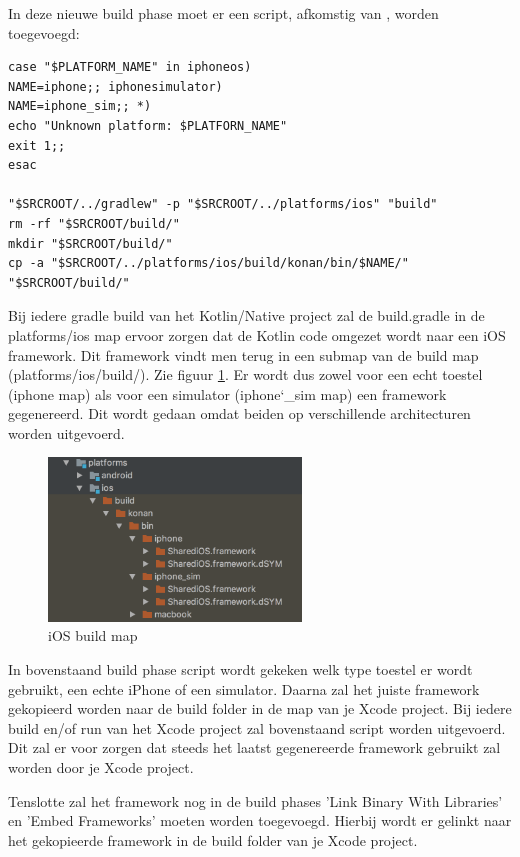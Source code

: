 In deze nieuwe build phase moet er een script, afkomstig van \textcite{AlbertGao}, worden toegevoegd: 
\begin{lstlisting}
case "$PLATFORM_NAME" in iphoneos)
NAME=iphone;; iphonesimulator)
NAME=iphone_sim;; *)
echo "Unknown platform: $PLATFORN_NAME"
exit 1;;
esac

"$SRCROOT/../gradlew" -p "$SRCROOT/../platforms/ios" "build"
rm -rf "$SRCROOT/build/"
mkdir "$SRCROOT/build/"
cp -a "$SRCROOT/../platforms/ios/build/konan/bin/$NAME/" "$SRCROOT/build/"
\end{lstlisting}

Bij iedere gradle build van het Kotlin/Native project zal de build.gradle in de platforms/ios map ervoor zorgen dat de Kotlin code omgezet wordt naar een iOS framework. Dit framework vindt men terug in een submap van de build map (platforms/ios/build/). Zie figuur \ref{fig:stap6-build}. Er wordt dus zowel voor een echt toestel (iphone map) als voor een simulator (iphone\char`_sim map) een framework gegenereerd. Dit wordt gedaan omdat beiden op verschillende architecturen worden uitgevoerd.

\begin{figure} [ht]
	\centering
	\includegraphics[width=0.60\textwidth]{img/stap6-build.png}
	\caption{iOS build map}
	\label{fig:stap6-build}
\end{figure}

In bovenstaand build phase script wordt gekeken welk type toestel er wordt gebruikt, een echte iPhone of een simulator. Daarna zal het juiste framework gekopieerd worden naar de build folder in de map van je Xcode project. Bij iedere build en/of run van het Xcode project zal bovenstaand script worden uitgevoerd. Dit zal er voor zorgen dat steeds het laatst gegenereerde framework gebruikt zal worden door je Xcode project.

Tenslotte zal het framework nog in de build phases 'Link Binary With Libraries' en 'Embed Frameworks' moeten worden toegevoegd. Hierbij wordt er gelinkt naar het gekopieerde framework in de build folder van je Xcode project.


